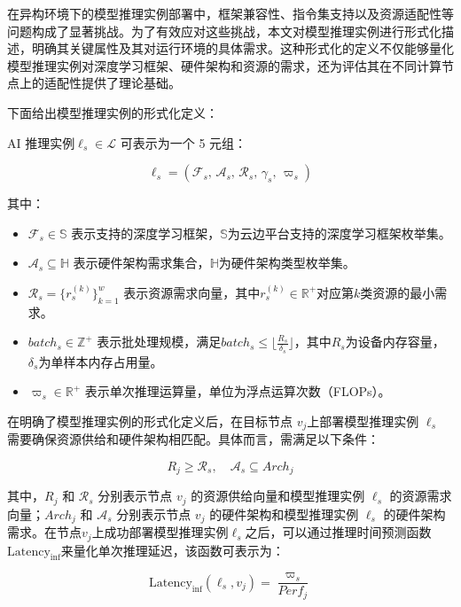 在异构环境下的模型推理实例部署中，框架兼容性、指令集支持以及资源适配性等问题构成了显著挑战。为了有效应对这些挑战，本文对模型推理实例进行形式化描述，明确其关键属性及其对运行环境的具体需求。这种形式化的定义不仅能够量化模型推理实例对深度学习框架、硬件架构和资源的需求，还为评估其在不同计算节点上的适配性提供了理论基础。

下面给出模型推理实例的形式化定义：

\begin{definition}[模型推理实例] 
\label{def:aimodel}
AI 推理实例$\ell_s \in \mathcal{L}$ 可表示为一个 5 元组：
\end{definition}

$$
\ell_s = (\mathcal{F}_s,\, \mathcal{A}_s,\, \mathcal{R}_s,\, \gamma_s,\, \varpi_s)
$$

其中：
\begin{itemize}
    \item $\mathcal{F}_s \in \mathbb{S}$ 表示支持的深度学习框架，$\mathbb{S}$为云边平台支持的深度学习框架枚举集。
    \item $\mathcal{A}_s \subseteq \mathbb{H}$ 表示硬件架构需求集合，$\mathbb{H}$为硬件架构类型枚举集。
    \item $\mathcal{R}_s = \{r^{(k)}_s\}_{k=1}^w$ 表示资源需求向量，其中$r^{(k)}_s \in \mathbb{R}^+$对应第$k$类资源的最小需求。
    \item $batch_s \in \mathbb{Z}^+$ 表示批处理规模，满足$batch_s \leq \lfloor \frac{R_s}{\delta_s} \rfloor$，其中$R_s$为设备内存容量，$\delta_s$为单样本内存占用量。
    \item $\varpi_s \in \mathbb{R}^+$ 表示单次推理运算量，单位为浮点运算次数（FLOPs）。
\end{itemize}

在明确了模型推理实例的形式化定义后，在目标节点 $v_j$上部署模型推理实例 $\ell_s$ 需要确保资源供给和硬件架构相匹配。具体而言，需满足以下条件：

\begin{equation}
R_j \geq \mathcal{R}_s, \quad \mathcal{A}_s \subseteq Arch_j
\end{equation}

其中，$R_j$ 和 $\mathcal{R}_s$ 分别表示节点 $v_j$ 的资源供给向量和模型推理实例 $\ell_s$ 的资源需求向量；$Arch_j$ 和 $\mathcal{A}_s$ 分别表示节点 $v_j$ 的硬件架构和模型推理实例 $\ell_s$ 的硬件架构需求。在节点$v_j$上成功部署模型推理实例$\ell_s$之后，可以通过推理时间预测函数$\text{Latency}_{\text{inf}}$来量化单次推理延迟，该函数可表示为：

\begin{equation}
\text{Latency}_{\text{inf}}(\ell_s, v_j)= \frac{\varpi_s}{Perf_j}
\end{equation}

